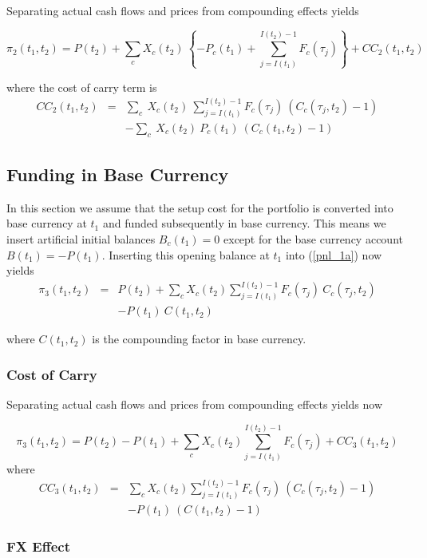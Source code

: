 Separating actual cash flows and prices from compounding effects yields

$$
	\pi_2(t_1, t_2) = P(t_2) + \sum_c X_c(t_2)\:\left\{-P_c(t_1)
	+ \sum_{j=I(t_1)}^{I(t_2)-1}F_c(\tau_j)\right\}
	+ CC_2(t_1,t_2)
$$

where the cost of carry term is
\begin{eqnarray*}
CC_2(t_1,t_2) &=& \sum_c \:X_c(t_2)\:
\sum_{j=I(t_1)}^{I(t_2)-1} F_c(\tau_j) \: \left(C_c(\tau_j, t_2) - 1\right)\\
&& - \sum_c \:X_c(t_2)\:P_c(t_1)\:\left(C_c(t_1, t_2) - 1\right)
\end{eqnarray*}

\subsection*{Funding in Base Currency}\label{funding_base_ccy}

In this section we assume that the setup cost for the portfolio is converted into base currency at $t_1$ and funded subsequently in base currency.
This means we insert artificial initial balances $B_c(t_1)=0$ except for the base currency account $B(t_1) = -P(t_1)$.
Inserting this opening balance at $t_1$ into (\ref{pnl_1a}) now yields
\begin{eqnarray}
	\pi_3(t_1, t_2) &=& P(t_2)
	+ \sum_c X_c(t_2) \sum_{j=I(t_1)}^{I(t_2)-1}F_c(\tau_j)\:C_c(\tau_j, t_2)
	\nonumber\\
	&& - P(t_1)\:C(t_1, t_2)
	\label{pnl_4}
\end{eqnarray}

where $C(t_1,t_2)$ is the compounding factor in base currency.

\subsubsection*{Cost of Carry}

Separating actual cash flows and prices from compounding effects yields now

$$
	\pi_3(t_1, t_2) = P(t_2) - P(t_1)
	+ \sum_c X_c(t_2) \sum_{j=I(t_1)}^{I(t_2)-1}F_c(\tau_j)
	+ CC_3(t_1, t_2)
$$
where
\begin{eqnarray*}
CC_3(t_1, t_2) &=&
\sum_c X_c(t_2) \sum_{j=I(t_1)}^{I(t_2)-1}F_c(\tau_j)\:(C_c(\tau_j, t_2)-1)\\
&&  - P(t_1)\:(C(t_1, t_2) - 1)
\end{eqnarray*}

\subsubsection*{FX Effect}\label{fx_effect}

